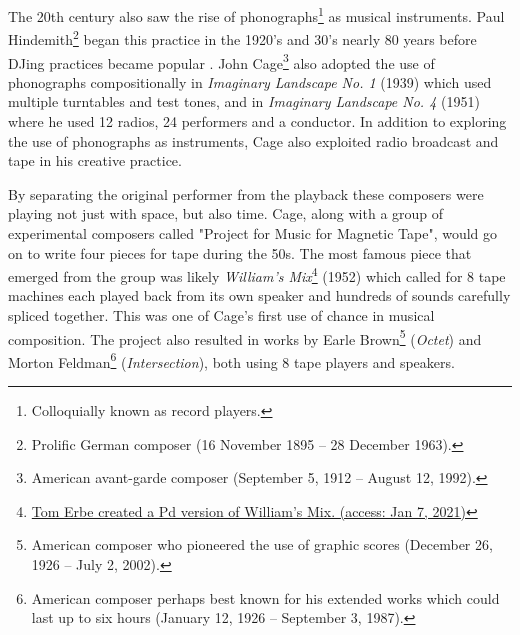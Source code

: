 
The 20th century also saw the rise of phonographs\footnote{Colloquially known as record players.} as musical instruments. Paul Hindemith\footnote{Prolific German composer (16 November 1895 – 28 December 1963).} began this practice in the 1920's and 30's nearly 80 years before DJing practices became popular \cite{manning2013electronic}. John Cage\footnote{American avant-garde composer (September 5, 1912 – August 12, 1992).} also adopted the use of phonographs compositionally in \textit{Imaginary Landscape No. 1} (1939) which used multiple turntables and test tones, and in \textit{Imaginary Landscape No. 4} (1951) where he used 12 radios, 24 performers and a conductor. In addition to exploring the use of phonographs as instruments, Cage also exploited radio broadcast and tape in his creative practice.  


By separating the original performer from the playback these composers were playing not just with space, but also time. Cage, along with a group of experimental composers called "Project for Music for Magnetic Tape", would go on to write four pieces for tape \cite{cage1961experimental} during the 50s. The most famous piece that emerged from the group was likely \textit{William's Mix}\footnote{\href{http://tre.ucsd.edu/wordpress/?p=644}{Tom Erbe created a Pd version of William's Mix. (access: Jan 7, 2021)} } (1952) which called for 8 tape machines each played back from its own speaker and hundreds of sounds carefully spliced together. This was one of Cage's first use of chance in musical composition. The project also resulted in works by Earle Brown\footnote{American composer who pioneered the use of graphic scores (December 26, 1926 – July 2, 2002).} (\textit{Octet}) and Morton Feldman\footnote{American composer perhaps best known for his extended works which could last up to six hours (January 12, 1926 – September 3, 1987).} (\textit{Intersection}), both using 8 tape players and speakers. 

